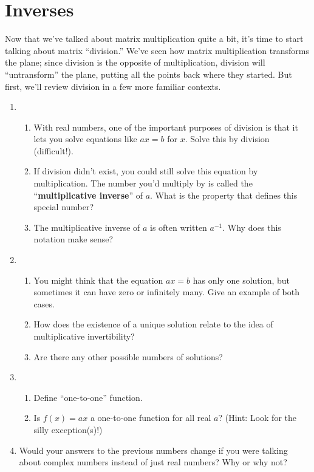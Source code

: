 \documentclass[../gatm.tex]{subfiles}
\begin{document}
\section{Inverses}
\setcounter{problem_i}{0}

Now that we've talked about matrix multiplication quite a bit, it's time to start talking about matrix ``division.'' We've seen how matrix multiplication transforms the plane; since division is the opposite of multiplication, division will ``untransform'' the plane, putting all the points back where they started. But first, we'll review division in a few more familiar contexts.

\begin{enumerate}
\setcounter{enumi}{\value{problem_i}}
\item \begin{enumerate}
\item With real numbers, one of the important purposes of division is that it lets you solve equations like $ax=b$ for $x$. Solve this by division (difficult!).
\item If division didn't exist, you could still solve this equation by multiplication. The number you'd multiply by is called the ``\textbf{multiplicative inverse}'' of $a$. What is the property that defines this special number?
\item The multiplicative inverse of $a$ is often written $a^{-1}$. Why does this notation make sense?
\end{enumerate}
\item \begin{enumerate}
\item You might think that the equation $ax=b$ has only one solution, but sometimes it can have zero or infinitely many. Give an example of both cases.
\item How does the existence of a unique solution relate to the idea of multiplicative invertibility?
\item Are there any other possible numbers of solutions?
\end{enumerate}
\item \begin{enumerate}
\item Define ``one-to-one'' function.
\item Is $f(x)=ax$ a one-to-one function for all real $a$? (Hint: Look for the silly exception(s)!)
\end{enumerate}
\item Would your answers to the previous numbers change if you were talking about complex numbers instead of just real numbers? Why or why not?
\setcounter{problem_i}{\value{enumi}}
\end{enumerate}
\end{document}
